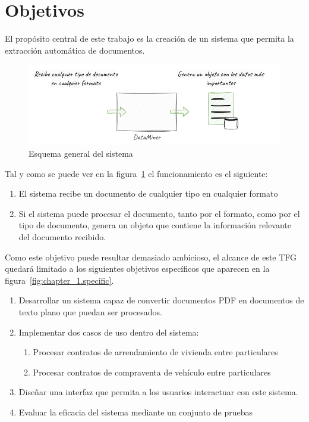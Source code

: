 \section{Objetivos}

El propósito central de este trabajo es la creación de un sistema que permita la extracción automática de documentos.

\begin{figure}
    \begin{center}
        \includegraphics[width=\textwidth]{chapter/1/images/chapter_1.overview}
        \caption{Esquema general del sistema}
        \label{fig:chapter_1.overview}
    \end{center}
\end{figure}

Tal y como se puede ver en la figura~\ref{fig:chapter_1.overview} el funcionamiento es el siguiente:

\begin{enumerate}
    \item El sistema recibe un documento de cualquier tipo en cualquier formato
    \item
    Si el sistema puede procesar el documento, tanto por el formato, como por el tipo de documento, genera un objeto que
    contiene la información relevante del documento recibido.
\end{enumerate}

Como este objetivo puede resultar demasiado ambicioso, el alcance de este TFG quedará limitado a los siguientes
objetivos específicos que aparecen en la figura~\ref{fig:chapter_1.specific}.

\begin{enumerate}
    \item
    Desarrollar un sistema capaz de convertir documentos PDF en documentos de texto plano que puedan ser procesados.
    \item Implementar dos casos de uso dentro del sistema:
    \begin{enumerate}
        \item Procesar contratos de arrendamiento de vivienda entre particulares
        \item Procesar contratos de compraventa de vehículo entre particulares
    \end{enumerate}
    \item Diseñar una interfaz que permita a los usuarios interactuar con este sistema.
    \item Evaluar la eficacia del sistema mediante un conjunto de pruebas
\end{enumerate}

